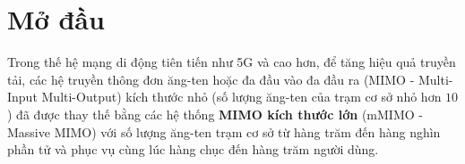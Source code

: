 \clearpage
{}

\chapter*{Mở đầu}
\label{sec:intro}


Trong thế hệ mạng di động tiên tiến như 5G và cao hơn, để tăng hiệu quả truyền tải, các hệ truyền thông đơn ăng-ten hoặc đa đầu vào đa đầu ra (MIMO - Multi-Input Multi-Output) kích thước nhỏ (số lượng ăng-ten của trạm cơ sở nhỏ hơn $10$) đã được thay thế bằng các hệ thống \textbf{MIMO kích thước lớn} (mMIMO - Massive MIMO) với số lượng ăng-ten trạm cơ sở từ hàng trăm đến hàng nghìn phần tử và phục vụ cùng lúc hàng chục đến hàng trăm người dùng. 

